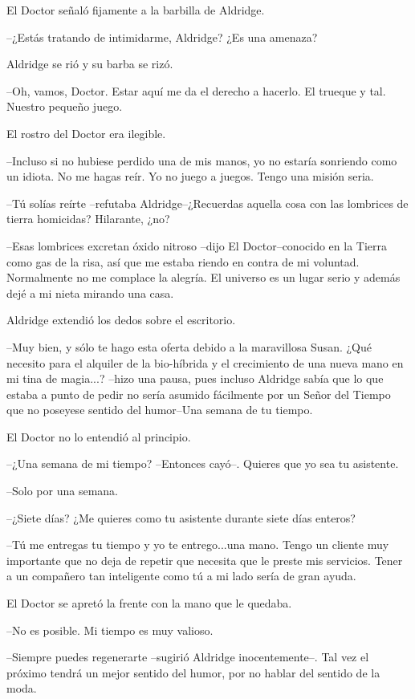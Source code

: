 El Doctor señaló fijamente a la barbilla de Aldridge. 

--¿Estás tratando de intimidarme, Aldridge? ¿Es una amenaza?

Aldridge se rió y su barba se rizó. 

--Oh, vamos, Doctor. Estar aquí me da el derecho a hacerlo. El trueque y tal. Nuestro pequeño juego.

El rostro del Doctor era ilegible. 

--Incluso si no hubiese perdido una de mis manos, yo no estaría sonriendo como un idiota. No me hagas reír. Yo no juego a juegos. Tengo una misión seria.

--Tú solías reírte --refutaba Aldridge--¿Recuerdas aquella cosa con las lombrices de tierra homicidas? Hilarante, ¿no?

--Esas lombrices excretan óxido nitroso --dijo El Doctor--conocido en la Tierra como gas de la risa, así que me estaba riendo en contra de mi voluntad. Normalmente no me complace la alegría. El universo es un lugar serio y además dejé a mi nieta mirando una casa.

Aldridge extendió los dedos sobre el escritorio. 

--Muy bien, y sólo te hago esta oferta debido a la maravillosa Susan. ¿Qué necesito para el alquiler de la bio-híbrida y el crecimiento de una nueva mano en mi tina de magia...? --hizo una pausa, pues incluso Aldridge sabía que lo que estaba a punto de pedir no sería asumido fácilmente por un Señor del Tiempo que no poseyese sentido del humor--Una semana de tu tiempo.

El Doctor no lo entendió al principio.

--¿Una semana de mi tiempo? --Entonces cayó--. Quieres que yo sea tu asistente.

--Solo por una semana.

--¿Siete días? ¿Me quieres como tu asistente durante siete días enteros?

--Tú me entregas tu tiempo y yo te entrego...una mano. Tengo un cliente muy importante que no deja de repetir que necesita que le preste mis servicios. Tener a un compañero tan inteligente como tú a mi lado sería de gran ayuda.

El Doctor se apretó la frente con la mano que le quedaba. 

--No es posible. Mi tiempo es muy valioso.

--Siempre puedes regenerarte --sugirió Aldridge inocentemente--. Tal vez el próximo tendrá un mejor sentido del humor, por no hablar del sentido de la moda.

